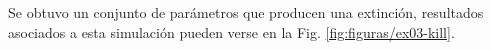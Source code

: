 \documentclass[twocolumn,aps,prl]{revtex4-1}
\begin{document}
Se obtuvo un conjunto de parámetros que producen una extinción, resultados asociados a esta simulación pueden verse en la Fig. \ref{fig:figuras/ex03-kill}.

\end{document}
